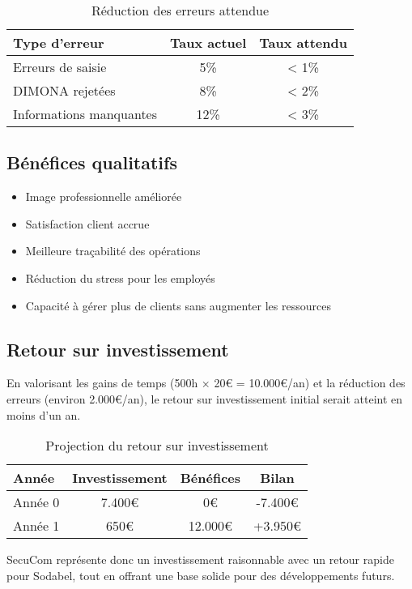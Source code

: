 \begin{table}[h]
\centering
\begin{tabular}{|l|c|c|}
\hline
\textbf{Type d'erreur} & \textbf{Taux actuel} & \textbf{Taux attendu} \\
\hline
Erreurs de saisie & 5\% & < 1\% \\
DIMONA rejetées & 8\% & < 2\% \\
Informations manquantes & 12\% & < 3\% \\
\hline
\end{tabular}
\caption{Réduction des erreurs attendue}
\end{table}

\subsection{Bénéfices qualitatifs}

\begin{itemize}
  \item Image professionnelle améliorée
  \item Satisfaction client accrue
  \item Meilleure traçabilité des opérations
  \item Réduction du stress pour les employés
  \item Capacité à gérer plus de clients sans augmenter les ressources
\end{itemize}

\subsection{Retour sur investissement}

En valorisant les gains de temps (500h × 20€ = 10.000€/an) et la réduction des erreurs (environ 2.000€/an), le retour sur investissement initial serait atteint en moins d'un an.

\begin{table}[h]
\centering
\begin{tabular}{|l|c|c|c|}
\hline
\textbf{Année} & \textbf{Investissement} & \textbf{Bénéfices} & \textbf{Bilan} \\
\hline
Année 0 & 7.400€ & 0€ & -7.400€ \\
Année 1 & 650€ & 12.000€ & +3.950€ \\
\hline
\end{tabular}
\caption{Projection du retour sur investissement}
\end{table}

SecuCom représente donc un investissement raisonnable avec un retour rapide pour Sodabel, tout en offrant une base solide pour des développements futurs.
